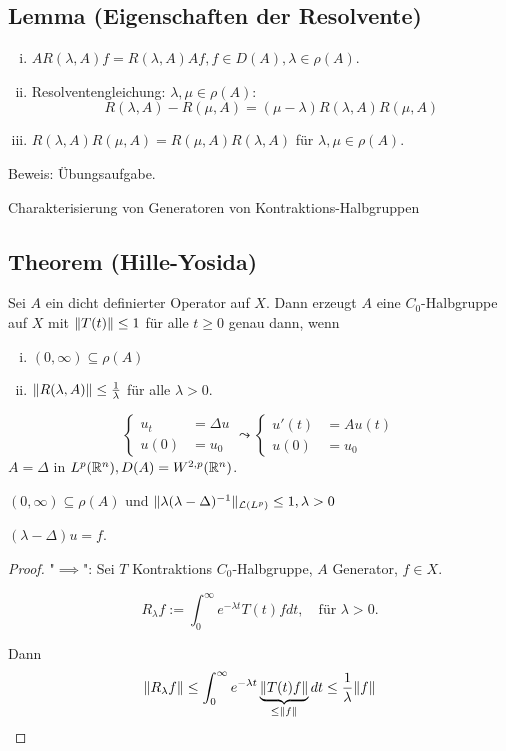 \subsection{Lemma (Eigenschaften der Resolvente)}

\begin{enumerate}[i)]
  \item $A R(\lambda, A) f = R(\lambda, A) A f, f \in D(A), \lambda \in \rho(A)$.
  \item  Resolventengleichung: $\lambda, \mu \in \rho(A)$: 
  $$
  R(\lambda, A) - R(\mu, A) = (\mu - \lambda) R(\lambda, A) R(\mu, A)
  $$
  \item $R(\lambda, A) R(\mu, A) = R(\mu, A) R(\lambda, A)$ für $\lambda, \mu \in \rho(A)$. 
\end{enumerate}

Beweis: Übungsaufgabe.

Charakterisierung von Generatoren von Kontraktions-Halbgruppen

\subsection{Theorem (Hille-Yosida)}

Sei $A$ ein dicht definierter Operator auf $X$.
Dann erzeugt $A$ eine $C_0$-Halbgruppe auf $X$ mit $\lVert T(t) \rVert \leq 1$ für alle $t \geq 0$ genau dann, wenn
\begin{enumerate}[i)]
  \item $(0, \infty) \subseteq \rho(A)$
  \item $\lVert R(\lambda, A) \rVert \leq \frac{1}{\lambda}$ für alle $\lambda > 0$.
\end{enumerate}

\begin{bem}
  $$
  \begin{cases} u_t &= \Delta u \\ u(0) &= u_0 \end{cases} \leadsto 
  \begin{cases} u'(t) &= A u(t) \\ u(0) &= u_0 \end{cases}
  $$
  $ A = \Delta $ in $ L^p(\mathbb{R}^n), D(A) = W^{2,p}(\mathbb{R}^n) $.
 
  $(0,\infty) \subseteq \rho(A)$ und $\lVert \lambda (\lambda - \Delta)^{-1} \rVert_{\mathcal{L}(L^p)} \leq 1, \lambda > 0$

  $(\lambda - \Delta) u = f$.
\end{bem}

\begin{proof}
"$\implies$": 
Sei $T$ Kontraktions $C_0$-Halbgruppe, $A$ Generator, $f \in X$.

$$R_\lambda f := \int_0^\infty e^{-\lambda t} T(t) f dt, \quad\text{für } \lambda > 0.$$

Dann
$$
\lVert R_\lambda f \rVert 
\leq \int_0^\infty e^{-\lambda t} \underbrace{\lVert T(t) f \rVert}_{\leq \lVert f \rVert} dt 
\leq \frac{1}{\lambda} \lVert f \rVert
$$
\end{proof}

